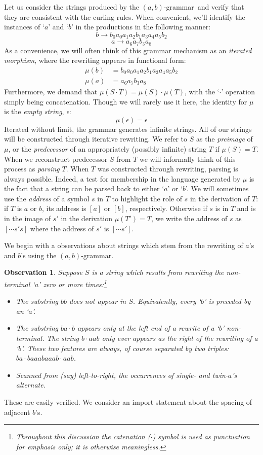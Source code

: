 \documentclass[11pt]{article}
\def\emph#1{{\em #1\/}}
\def\term#1{\emph{#1}}
\newcounter{thm}
\newtheorem{observation}[thm]{Observation}
\def\ni{\noindent}
\def\ab{$(a,b)$}
\def\abg{\ab-grammar}
\def\q#1{`$#1$'}
\def\addr#1{$[#1]$}
\begin{document}
Let us consider the strings produced by the \abg\ and verify that they
are consistent with the curling rules.  When convenient, we'll identify the instances
of \q{a} and \q{b} in the productions in the following manner:
$$b\rightarrow b_0a_0a_1a_2b_1a_3a_4a_5b_2$$
$$a\rightarrow a_6a_7b_3a_8$$
\ni As a convenience, we will often think of this grammar mechanism as an
\term{iterated morphism}, where the rewriting appears in functional form:
\begin{align*}
\mu(b)&=b_0a_0a_1a_2b_1a_3a_4a_5b_2\\
\mu(a)&=a_6a_7b_3a_8
\end{align*}
\ni Furthermore, we demand that $\mu(S\cdot T)=\mu(S)\cdot\mu(T)$, with
the `$\cdot$' operation simply being concatenation.  Though we will rarely
use it here, the identity for $\mu$ is the \term{empty string}, $\epsilon$:
$$\mu(\epsilon)=\epsilon$$
\ni Iterated without limit, the grammar generates infinite strings.  
All of our strings will be constructed through iterative rewriting.
We refer to $S$ as the \term{preimage} of $\mu$, or the \term{predecessor}
of an appropriately (possibly infinite) string $T$ if $\mu(S)=T$.  When we reconstruct predecessor $S$ from $T$ we will informally think of this process
as \term{parsing} $T$.  When $T$ was constructed through rewriting, parsing is
always possible.  Indeed, a test for membership in the language generated by
$\mu$ is the fact that a string can be parsed back to either \q{a} or \q{b}.
We will sometimes use the \term{address} of a symbol $s$ in $T$ to highlight
the role of $s$ in the derivation of $T$: if $T$ is $a$ or $b$, its address is
\addr{a} or \addr{b}, respectively. Otherwise if $s$ is in $T$ and is in the
image of $s'$ in the derivation $\mu(T')=T$, we write the address of $s$ as
\addr{\cdots s's} where the address of $s'$ is \addr{\cdots s'}.

We begin with a observations
about strings which stem from the rewriting of $a$'s and $b$'s using the
\abg.
\begin{observation}
Suppose $S$ is a string which results from rewriting the non-terminal
\q{a} zero or more times:\footnote{Throughout this discussion the catenation ($\cdot$) symbol
is used as punctuation for emphasis only; it is otherwise meaningless.}
\begin{itemize}
\item The substring $bb$ does not appear in $S$.  Equivalently,
every \q{b} is preceded by an \q{a}.
\item The substring $ba\cdot b$ appears only at the left end of a
rewrite of a \q{b} non-terminal.  The string $b\cdot aab$ only ever appears
as the right of the rewriting of a \q{b}.  These two features are always, of
course separated by two triples: $ba\cdot baaabaaab\cdot aab$.
\item Scanned from (say) left-to-right, the occurrences of single- and twin-$a$'s alternate.
\end{itemize}
\end{observation}
\ni These are easily verified. We consider an import statement about
the spacing of adjacent $b$'s.
\end{document}
